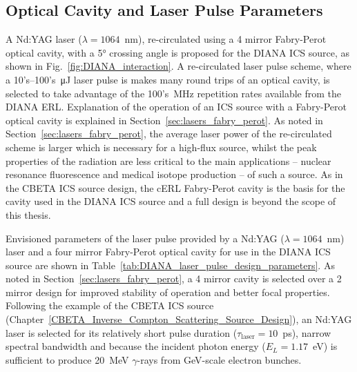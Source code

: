 \documentclass[../main.tex]{subfiles}
\begin{document}
\subsection{Optical Cavity and Laser Pulse Parameters}
\label{sec:DIANA_laser_fabry_perot}

A Nd:YAG laser ($\lambda = 1064$~\si{\nano\meter}), re-circulated using a 4 mirror Fabry-Perot optical cavity, with a 5\si{\degree} crossing angle is proposed for the DIANA ICS source, as shown in Fig.~\ref{fig:DIANA_interaction}. A re-circulated laser pulse scheme, where a 10's--100's~\si{\micro\joule} laser pulse is makes many round trips of an optical cavity, is selected to take advantage of the 100's~\si{\mega\hertz} repetition rates available from the DIANA ERL. Explanation of the operation of an ICS source with a Fabry-Perot optical cavity is explained in Section~\ref{sec:lasers_fabry_perot}. As noted in Section~\ref{sec:lasers_fabry_perot}, the average laser power of the re-circulated scheme is larger which is necessary for a high-flux source, whilst the peak properties of the radiation are less critical to the main applications --  nuclear resonance fluorescence and medical isotope production -- of such a source. As in the CBETA ICS source design, the cERL Fabry-Perot cavity \cite{akagi2016narrow} is the basis for the cavity used in the DIANA ICS source and a full design is beyond the scope of this thesis.

Envisioned parameters of the laser pulse provided by a Nd:YAG ($\lambda = 1064$~\si{\nano\meter}) laser and a four mirror Fabry-Perot optical cavity for use in the DIANA ICS source are shown in Table~\ref{tab:DIANA_laser_pulse_design_parameters}. As noted in Section~\ref{sec:lasers_fabry_perot}, a 4 mirror cavity is selected over a 2 mirror design for improved stability of operation and better focal properties. Following the example of the CBETA ICS source (Chapter~\ref{CBETA_Inverse_Compton_Scattering_Source_Design}), an Nd:YAG laser is selected for its relatively short pulse duration ($\tau_{\mathrm{laser}}=10$~\si{\pico\second}), narrow spectral bandwidth and because the incident photon energy ($E_{L}=1.17$~\si{\electronvolt}) is sufficient to produce 20~\si{\mega\electronvolt} $\gamma$-rays from \si{\giga\electronvolt}-scale electron bunches. 
\end{document}
